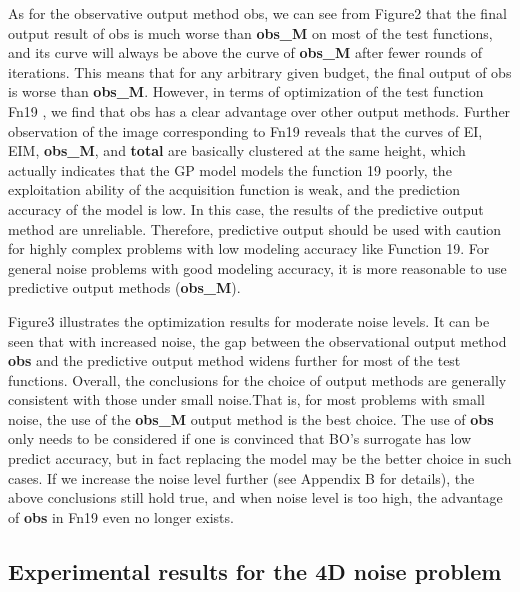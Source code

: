 \documentclass{article}
\begin{document}
\hspace{2em}As for the observative output method obs, we can see from Figure2 that the final output result of obs is much worse than \textbf{obs\_M} on most of the test functions, and its curve will always be above the curve of \textbf{obs\_M} after fewer rounds of iterations. This means that for any arbitrary given budget, the final output of obs is worse than \textbf{obs\_M}. However, in terms of optimization of the test function Fn19 , we find that obs has a clear advantage over other output methods. Further observation of the image corresponding to Fn19 reveals that the curves of EI, EIM, \textbf{obs\_M}, and  \textbf{total} are basically clustered at the same height, which actually indicates that the GP model models the function 19 poorly, the exploitation ability of the acquisition function is weak, and the prediction accuracy of the model is low. In this case, the results of the predictive output method are unreliable. Therefore, predictive output should be used with caution for highly complex problems with low modeling accuracy like Function 19. For general noise problems with good modeling accuracy, it is more reasonable to use predictive output methods (\textbf{obs\_M}). 

\hspace{2em}Figure3 illustrates the optimization results for moderate noise levels. It can be seen that with increased noise, the gap between the observational output method \textbf{obs} and the predictive output method widens further for most of the test functions. Overall, the conclusions for the choice of output methods are generally consistent with those under small noise.That is, for most problems with small noise, the use of the \textbf{obs\_M} output method is the best choice. The use of \textbf{obs} only needs to be considered if one is convinced that BO's surrogate has low predict accuracy, but in fact replacing the model may be the better choice in such cases. If we increase the noise level further (see Appendix B for details), the above conclusions still hold true, and when noise level is too high, the advantage of \textbf{obs} in Fn19 even no longer exists.

\subsection{Experimental results for the 4D noise problem}
\end{document}

